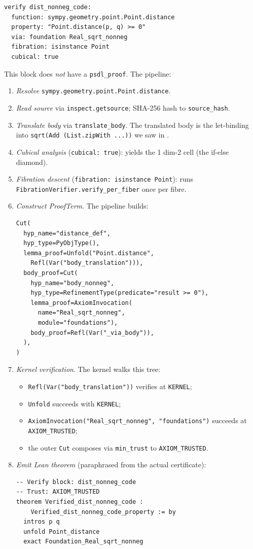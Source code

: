 \begin{lstlisting}[language=deppyfile,caption={The
\texttt{dist\_nonneg\_code} block from \texttt{sympy\_geometry.deppy}.}]
verify dist_nonneg_code:
  function: sympy.geometry.point.Point.distance
  property: "Point.distance(p, q) >= 0"
  via: foundation Real_sqrt_nonneg
  fibration: isinstance Point
  cubical: true
\end{lstlisting}

This block does \emph{not} have a \texttt{psdl\_proof}.  The
pipeline:
\begin{enumerate}[leftmargin=1.7em]
  \item \emph{Resolve} \texttt{sympy.geometry.point.Point.distance}.
  \item \emph{Read source} via \texttt{inspect.getsource}; SHA-256
    hash to \texttt{source\_hash}.
  \item \emph{Translate body} via \texttt{translate\_body}.  The
    translated body is the let-binding into
    \verb|sqrt(Add (List.zipWith ...))| we saw in
    .
  \item \emph{Cubical analysis} (\texttt{cubical: true}): yields the
    1 dim-2 cell (the if-else diamond).
  \item \emph{Fibration descent} (\texttt{fibration: isinstance
    Point}): runs \texttt{FibrationVerifier.verify\_per\_fiber} once
    per fibre.
  \item \emph{Construct ProofTerm}.  The pipeline builds:
\begin{verbatim}
Cut(
  hyp_name="distance_def",
  hyp_type=PyObjType(),
  lemma_proof=Unfold("Point.distance",
    Refl(Var("body_translation"))),
  body_proof=Cut(
    hyp_name="body_nonneg",
    hyp_type=RefinementType(predicate="result >= 0"),
    lemma_proof=AxiomInvocation(
      name="Real_sqrt_nonneg",
      module="foundations"),
    body_proof=Refl(Var("_via_body")),
  ),
)
\end{verbatim}
  \item \emph{Kernel verification}.  The kernel walks this tree:
\begin{itemize}[leftmargin=1.7em]
  \item \texttt{Refl(Var("body\_translation"))} verifies at
    \texttt{KERNEL};
  \item \texttt{Unfold} succeeds with \texttt{KERNEL};
  \item \texttt{AxiomInvocation("Real\_sqrt\_nonneg",
    "foundations")} succeeds at \texttt{AXIOM\_TRUSTED};
  \item the outer \texttt{Cut} composes via \texttt{min\_trust} to
    \texttt{AXIOM\_TRUSTED}.
\end{itemize}
  \item \emph{Emit Lean theorem} (paraphrased from the actual
    certificate):
\begin{lstlisting}[language=lean4]
-- Verify block: dist_nonneg_code
-- Trust: AXIOM_TRUSTED
theorem Verified_dist_nonneg_code :
    Verified_dist_nonneg_code_property := by
  intros p q
  unfold Point_distance
  exact Foundation_Real_sqrt_nonneg
\end{lstlisting}
\end{enumerate}

